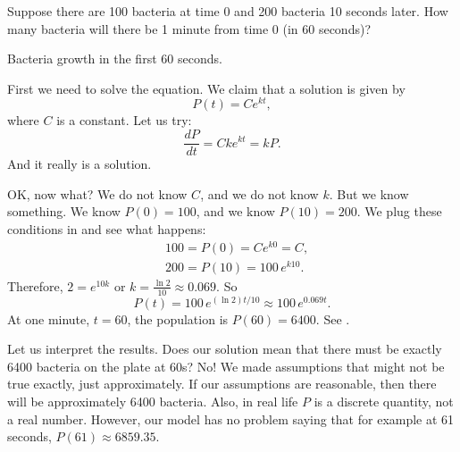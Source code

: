 \begin{example}
Suppose there are 100 bacteria at time 0 and 200 bacteria 10 seconds later.
How many bacteria will there be 1 minute from time 0 (in 60 seconds)?

\begin{mywrapfig}{3.25in}
\capstart
{}
\caption{Bacteria growth in the first 60 seconds.\label{intro:plotbactfig}}
\end{mywrapfig}
%
%
First we need to solve the equation.  We claim that a solution is given by
\begin{equation*}
P(t) = C e^{kt} ,
\end{equation*}
where $C$ is a constant.  Let us try:
\begin{equation*}
\frac{dP}{dt} = C k e^{kt} = k P .
\end{equation*}
And it really is a solution.

OK\@, now what?  We do not know $C$, and we do not know $k$.  But we know
something.  We know $P(0) = 100$, and we know 
$P(10) = 200$.  We plug these conditions in and see what happens:
\begin{align*}
& 100 = P(0) = C e^{k0} = C ,\\
& 200 = P(10) = 100 \, e^{k10} .
\end{align*}
Therefore, $2 = e^{10k}$ or $k = \frac{\ln 2}{10} \approx 0.069$.
So 
\begin{equation*}
P(t) = 100 \, e^{(\ln 2) t / 10} \approx 100 \, e^{0.069 t} .
\end{equation*}
At one minute, $t=60$, the population is $P(60) = 6400$.  See
.




Let us interpret the results.  Does our solution
mean that
there must be exactly 6400 bacteria on the plate at 60s?  No!  We made
assumptions that might not be true exactly, just approximately.
If our assumptions are reasonable,
then there will be approximately 6400 bacteria.
Also, in real life $P$ is a
discrete quantity, not a real number.  However, our model has no problem saying
that for example at 61 seconds, $P(61) \approx 6859.35$.
\end{example}


